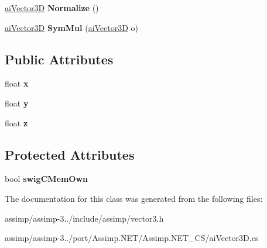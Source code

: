 \begin{DoxyCompactItemize}
\item 
\hypertarget{structai_vector3_d_aac32d3c993347cf2e6c560f99f55f061}{\hyperlink{structai_vector3_d}{ai\+Vector3\+D} {\bfseries Normalize} ()}\label{structai_vector3_d_aac32d3c993347cf2e6c560f99f55f061}

\item 
\hypertarget{structai_vector3_d_a5963dd735e0efbae2a09c732abc2dbdf}{\hyperlink{structai_vector3_d}{ai\+Vector3\+D} {\bfseries Sym\+Mul} (\hyperlink{structai_vector3_d}{ai\+Vector3\+D} o)}\label{structai_vector3_d_a5963dd735e0efbae2a09c732abc2dbdf}

\end{DoxyCompactItemize}
\subsection*{Public Attributes}
\begin{DoxyCompactItemize}
\item 
\hypertarget{structai_vector3_d_a3762d39eeb99def9ebd413b2bb8dd470}{float {\bfseries x}}\label{structai_vector3_d_a3762d39eeb99def9ebd413b2bb8dd470}

\item 
\hypertarget{structai_vector3_d_ac7b5fcc03324f8c3bc8429c95882dfb8}{float {\bfseries y}}\label{structai_vector3_d_ac7b5fcc03324f8c3bc8429c95882dfb8}

\item 
\hypertarget{structai_vector3_d_a2b93b892064995e8d24f4e3352175aae}{float {\bfseries z}}\label{structai_vector3_d_a2b93b892064995e8d24f4e3352175aae}

\end{DoxyCompactItemize}
\subsection*{Protected Attributes}
\begin{DoxyCompactItemize}
\item 
\hypertarget{structai_vector3_d_aa8af7fe507129429733e41feaf22d8a4}{bool {\bfseries swig\+C\+Mem\+Own}}\label{structai_vector3_d_aa8af7fe507129429733e41feaf22d8a4}

\end{DoxyCompactItemize}


The documentation for this class was generated from the following files\+:\begin{DoxyCompactItemize}
\item 
assimp/assimp-\/3../include/assimp/vector3.\+h\item 
assimp/assimp-\/3../port/\+Assimp.\+N\+E\+T/\+Assimp.\+N\+E\+T\+\_\+\+C\+S/ai\+Vector3\+D.\+cs\end{DoxyCompactItemize}
